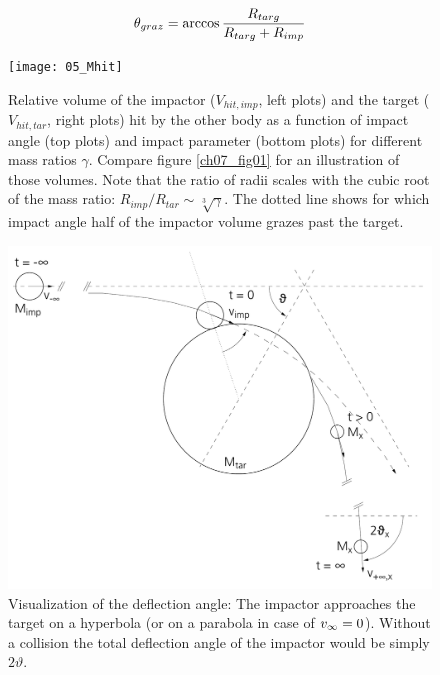 \begin{equation}
\label{ch03_eq001}
\theta_{graz} = \arccos{ \frac{R_{targ}}{R_{targ}+ R_{imp}} }
\end{equation}


\begin{figure}[htbp]
\begin{center}
\texttt{[image: 05\_Mhit]}
\caption{Relative volume of the impactor ($V_{hit, imp}$, left plots) and the target ($V_{hit, tar}$, right plots) hit by the other body as a function of impact angle (top plots) and impact parameter (bottom plots) for different mass ratios $\gamma$. Compare figure \ref{ch07_fig01} for an illustration of those volumes. Note that the ratio of radii scales with the cubic root of the mass ratio: $R_{imp} / R_{tar} \sim \sqrt[3]{\gamma}$. The dotted line shows for which impact angle half of the impactor volume grazes past the target.} 
\label{ch03_fig02}
\end{center}
\end{figure}

\begin{figure}[htbp]
\begin{center}
\includegraphics[scale=0.5]{04_vartheta}
\caption{Visualization of the deflection angle: The impactor approaches the target on a hyperbola (or on a parabola in case of $v_{\infty} = 0$). Without a collision the total deflection angle of the impactor would be simply $2 \vartheta$.}
\label{ch03_fig02}
\end{center}
\end{figure}


